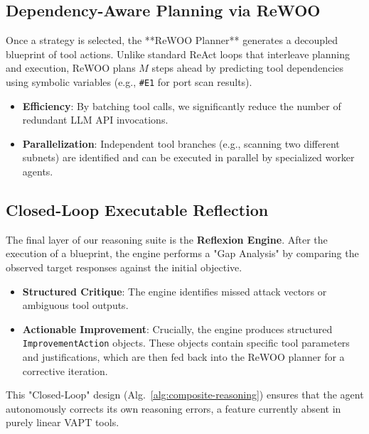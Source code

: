 \subsection{Dependency-Aware Planning via ReWOO}
Once a strategy is selected, the **ReWOO Planner** generates a decoupled blueprint of tool actions. Unlike standard ReAct loops that interleave planning and execution, ReWOO plans $M$ steps ahead by predicting tool dependencies using symbolic variables (e.g., \texttt{#E1} for port scan results).
\begin{itemize}
    \item \textbf{Efficiency}: By batching tool calls, we significantly reduce the number of redundant LLM API invocations.
    \item \textbf{Parallelization}: Independent tool branches (e.g., scanning two different subnets) are identified and can be executed in parallel by specialized worker agents.
\end{itemize}

\subsection{Closed-Loop Executable Reflection}
The final layer of our reasoning suite is the \textbf{Reflexion Engine}. After the execution of a blueprint, the engine performs a "Gap Analysis" by comparing the observed target responses against the initial objective.
\begin{itemize}
    \item \textbf{Structured Critique}: The engine identifies missed attack vectors or ambiguous tool outputs.
    \item \textbf{Actionable Improvement}: Crucially, the engine produces structured \texttt{ImprovementAction} objects. These objects contain specific tool parameters and justifications, which are then fed back into the ReWOO planner for a corrective iteration.
\end{itemize}
This "Closed-Loop" design (Alg.~\ref{alg:composite-reasoning}) ensures that the agent autonomously corrects its own reasoning errors, a feature currently absent in purely linear VAPT tools.



